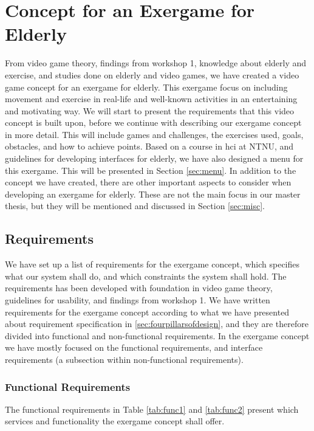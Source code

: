 \chapter{Concept for an Exergame for Elderly}
\label{chap:concept}
From video game theory, findings from workshop 1, knowledge about elderly and exercise, and studies done on elderly and video games, we have created a video game concept for an exergame for elderly. This exergame focus on including movement and exercise in real-life and well-known activities in an entertaining and motivating way. We will start to present the requirements that this video concept is built upon, before we continue with describing our exergame concept in more detail. This will include games and challenges, the exercises used, goals, obstacles, and how to achieve points. Based on a course in \ac{hci} at NTNU, and guidelines for developing interfaces for elderly, we have also designed a menu for this exergame. This will be presented in Section \ref{sec:menu}. In addition to the concept we have created, there are other important aspects to consider when developing an exergame for elderly. These are not the main focus in our master thesis, but they will be mentioned and discussed in Section \ref{sec:misc}.

\section{Requirements}
\label{sec:req}
We have set up a list of requirements for the exergame concept, which specifies what our system shall do, and which constraints the system shall hold. The requirements has been developed with foundation in video game theory, guidelines for usability, and findings from workshop 1. We have written requirements for the exergame concept according to what we have presented about requirement specification in \ref{sec:fourpillarsofdesign}, and they are therefore divided into functional and non-functional requirements. In the exergame concept we have mostly focused on the functional requirements, and interface requirements (a subsection within non-functional requirements). 

\subsection{Functional Requirements}
The functional requirements in Table \ref{tab:func1} and \ref{tab:func2} present which services and functionality the exergame concept shall offer.

